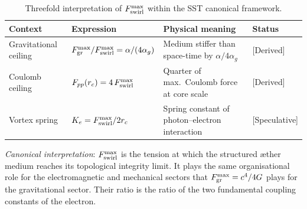 \begin{table}[h]
\centering
\caption{Threefold interpretation of $F_{\rm swirl}^{\max}$
         within the SST canonical framework.}
\label{tab:Fmax}
\begin{tabular}{llll}
\hline
\textbf{Context} & \textbf{Expression} & \textbf{Physical meaning}
  & \textbf{Status} \\
\hline
Gravitational ceiling &
  $F_{\rm gr}^{\max}/F_{\rm swirl}^{\max} = \alpha/(4\alpha_g)$ &
  Medium stiffer than space-time by $\alpha/4\alpha_g$ &
  [Derived] \\
Coulomb ceiling &
  $F_{pp}(r_c) = 4\,F_{\rm swirl}^{\max}$ &
  Quarter of max.\ Coulomb force at core scale &
  [Derived] \\
Vortex spring &
  $K_e = F_{\rm swirl}^{\max}/2r_c$ &
  Spring constant of photon--electron interaction &
  [Speculative] \\
\hline
\end{tabular}
\end{table}

 \textit{Canonical interpretation}:
$F_{\rm swirl}^{\max}$ is the tension at which the structured
æther medium reaches its topological integrity limit. It plays
the same organisational role for the electromagnetic and
mechanical sectors that $F_{\rm gr}^{\max} = c^4/4G$ plays for
the gravitational sector. Their ratio is the ratio of the two
fundamental coupling constants of the electron.

%
%
